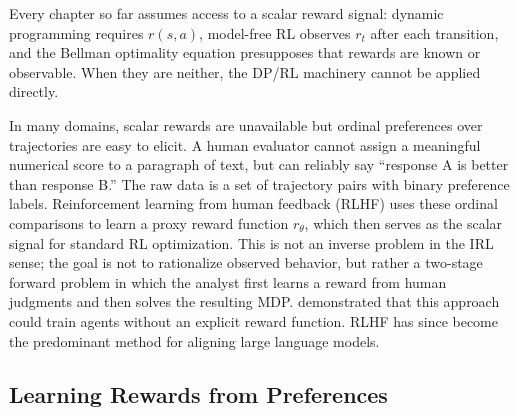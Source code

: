 Every chapter so far assumes access to a scalar reward signal: dynamic programming requires $r(s,a)$, model-free RL observes $r_t$ after each transition, and the Bellman optimality equation presupposes that rewards are known or observable. When they are neither, the DP/RL machinery cannot be applied directly.

In many domains, scalar rewards are unavailable but ordinal preferences over trajectories are easy to elicit. A human evaluator cannot assign a meaningful numerical score to a paragraph of text, but can reliably say ``response A is better than response B.'' The raw data is a set of trajectory pairs with binary preference labels. Reinforcement learning from human feedback (RLHF) uses these ordinal comparisons to learn a proxy reward function $r_\theta$, which then serves as the scalar signal for standard RL optimization. This is not an inverse problem in the IRL sense; the goal is not to rationalize observed behavior, but rather a two-stage forward problem in which the analyst first learns a reward from human judgments and then solves the resulting MDP. \citet{christiano:2017} demonstrated that this approach could train agents without an explicit reward function. RLHF has since become the predominant method for aligning large language models.

\subsection{Learning Rewards from Preferences}

